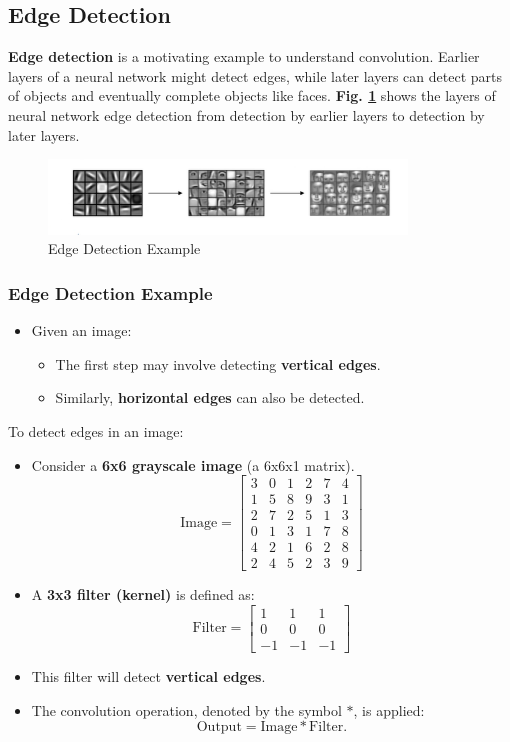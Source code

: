 \documentclass[letterpaper,12pt,notitlepage,twoside]{report}
\begin{document}
\subsection{Edge Detection}
\textbf{Edge detection} is a motivating example to understand convolution. Earlier layers of a neural network might detect edges, while later layers can detect parts of objects and eventually complete objects like faces. \textbf{Fig. \ref{fig:20}} shows the layers of neural network edge detection from detection by earlier layers to detection by later layers.
\begin{figure}[h]
	\centering
	\includegraphics[width=0.85\textwidth]{Images/Edge Detection Example.png}
	\caption{Edge Detection Example}
	\label{fig:20}
\end{figure}
\FloatBarrier

\subsubsection*{Edge Detection Example}
\begin{itemize}
    \item Given an image:
    \begin{itemize}[nosep]
        \item The first step may involve detecting \textbf{vertical edges}.
        \item Similarly, \textbf{horizontal edges} can also be detected.
    \end{itemize}
\end{itemize}

To detect edges in an image:
\begin{itemize}
    \item Consider a \textbf{6x6 grayscale image} (a 6x6x1 matrix).
    \[
    \text{Image} = 
    \begin{bmatrix}
    3 & 0 & 1 & 2 & 7 & 4 \\
    1 & 5 & 8 & 9 & 3 & 1 \\
    2 & 7 & 2 & 5 & 1 & 3 \\
    0 & 1 & 3 & 1 & 7 & 8 \\
    4 & 2 & 1 & 6 & 2 & 8 \\
    2 & 4 & 5 & 2 & 3 & 9 
    \end{bmatrix}
    \]
    \item A \textbf{3x3 filter (kernel)} is defined as:
    \[
    \text{Filter} = 
    \begin{bmatrix}
    1 & 1 & 1 \\
    0 & 0 & 0 \\
    -1 & -1 & -1
    \end{bmatrix}
    \]
    \item This filter will detect \textbf{vertical edges}.
    \item The convolution operation, denoted by the symbol $*$, is applied:
    \[
    \text{Output} = \text{Image} * \text{Filter}.
    \]
\end{itemize}
\end{document}
